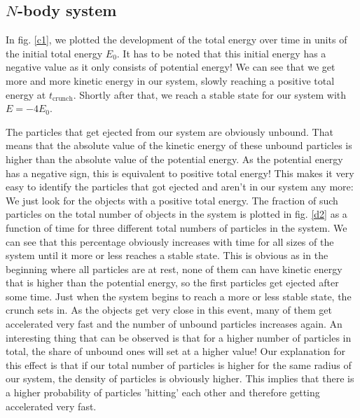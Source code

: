 \documentclass[10pt,a4paper]{article}
\begin{document}
\subsection{$N$-body system}
In fig. \ref{c1}, we plotted the development of the total energy over time in units of the initial total energy $E_0$. It has to be noted that this initial energy has a negative value as it only consists of potential energy! We can see that we get more and more kinetic energy in our system, slowly reaching a positive total energy at $t_\mathrm{crunch}$. Shortly after that, we reach a stable state for our system with $E=-4E_0$.

The particles that get ejected from our system are obviously unbound. That means that the absolute value of the kinetic energy of these unbound particles is higher than the absolute value of the potential energy. As the potential energy has a negative sign, this is equivalent to positive total energy! This makes it very easy to identify the particles that got ejected and aren't in our system any more: We just look for the objects with a positive total energy. The fraction of such particles on the total number of objects in the system is plotted in fig. \ref{d2} as a function of time for three different total numbers of particles in the system. We can see that this percentage obviously increases with time for all sizes of the system until it more or less reaches a stable state. This is obvious as in the beginning where all particles are at rest, none of them can have kinetic energy that is higher than the potential energy, so the first particles get ejected after some time. Just when the system begins to reach a more or less stable state, the crunch sets in. As the objects get very close in this event, many of them get accelerated very fast and the number of unbound particles increases again. An interesting thing that can be observed is that for a higher number of particles in total, the share of unbound ones will set at a higher value! Our explanation for this effect is that if our total number of particles is higher for the same radius of our system, the density of particles is obviously higher. This implies that there is a higher probability of particles 'hitting' each other and therefore getting accelerated very fast.
\end{document}

